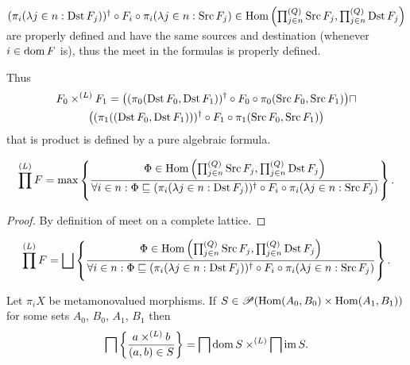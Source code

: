 \begin{rem}
  $(\pi_i(\lambda j \in n : \operatorname{Dst} F_j))^{\dagger} \circ F_i \circ
  \pi_i(\lambda j \in n : \operatorname{Src} F_j) \in \operatorname{Hom} \left(
  \prod^{(Q)}_{j \in n} \operatorname{Src} F_j , \prod^{(Q)}_{j \in n} \operatorname{Dst} F_j
  \right)$ are properly defined and have the same sources and destination
  (whenever $i \in \operatorname{dom} F$ is), thus the meet in the formulas is
  properly defined.
\end{rem}

\begin{rem}
  Thus
  \begin{multline*}
    F_0 \times^{(L)} F_1 = \bigl((\pi_0(\operatorname{Dst} F_0 , \operatorname{Dst}
    F_1))^{\dagger} \circ F_0 \circ \pi_0(\operatorname{Src} F_0 , \operatorname{Src}
    F_1)\bigr) \sqcap\\ \bigl((\pi_1((\operatorname{Dst} F_0 , \operatorname{Dst} F_1)))^{\dagger}
    \circ F_1 \circ \pi_1(\operatorname{Src} F_0 , \operatorname{Src} F_1)\bigr)
  \end{multline*}
  that is product is defined by a pure algebraic formula.
\end{rem}

\begin{prop}
  \[ \prod^{(L)} F = \max \left\{ \frac{ \Phi \in \operatorname{Hom} \left( \prod^{(Q)}_{j \in
  n} \operatorname{Src} F_j , \prod^{(Q)}_{j \in n} \operatorname{Dst} F_j \right)
  }{ \forall i \in n : \Phi \sqsubseteq (\pi_i(\lambda
  j \in n : \operatorname{Dst} F_j))^{\dagger} \circ F_i \circ \pi_i(\lambda j \in n
  : \operatorname{Src} F_j) }\right\}. \]
\end{prop}

\begin{proof}
  By definition of meet on a complete lattice.
\end{proof}

\begin{cor}
  \[ \prod^{(L)} F = \bigsqcup \setcond{ \Phi \in \Hom \left( \prod^{(Q)}_{j
  \in n} \Src F_j , \prod^{(Q)}_{j \in n} \Dst F_j \right)
  }{ \forall i \in n : \Phi \sqsubseteq (\pi_i(\lambda
  j \in n : \Dst F_j))^{\dagger} \circ F_i \circ \pi_i(\lambda j \in n
  : \Src F_j) }. \]
\end{cor}

\begin{thm}
  Let $\pi_i X$ be metamonovalued morphisms. If $S \in \mathscr{P} (\operatorname{Hom}
  (A_0 , B_0) \times \operatorname{Hom} (A_1 , B_1))$ for some sets $A_0$, $B_0$,
  $A_1$, $B_1$ then
  \[ \bigsqcap \left\{ \frac{ a \times^{(L)} b }{(a , b)\in S }\right\} =
     \bigsqcap \operatorname{dom} S \times^{(L)} \bigsqcap \operatorname{im} S. \]
\end{thm}

